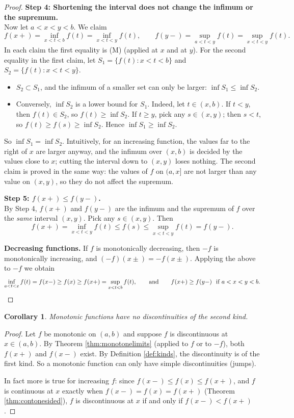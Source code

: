 \documentclass{article}
\theoremstyle{mythm}
\newtheorem{corollary}{Corollary}[theorem]
\begin{document}
\begin{proof}
\textbf{Step 4: Shortening the interval does not change the infimum or the supremum.}\\
Now let $a < x < y < b$. We claim
\[
f(x+) = \inf_{x < t < b} f(t) = \inf_{x < t < y} f(t), \qquad f(y-) = \sup_{a < t < y} f(t) = \sup_{x < t < y} f(t).
\]
In each claim the first equality is (M) (applied at $x$ and at $y$). For the second equality in the first claim, let $S_1 = \{f(t) : x < t < b\}$ and $S_2 = \{f(t) : x < t < y\}$.
\begin{itemize}
    \item $S_2 \subset S_1$, and the infimum of a smaller set can only be larger: $\inf S_1 \leq \inf S_2$.
    \item Conversely, $\inf S_2$ is a lower bound for $S_1$. Indeed, let $t \in (x,b)$. If $t < y$, then $f(t) \in S_2$, so $f(t) \geq \inf S_2$. If $t \geq y$, pick any $s \in (x,y)$; then $s < t$, so $f(t) \geq f(s) \geq \inf S_2$. Hence $\inf S_1 \geq \inf S_2$.
\end{itemize}
So $\inf S_1 = \inf S_2$. Intuitively, for an increasing function, the values far to the right of $x$ are larger anyway, and the infimum over $(x,b)$ is decided by the values close to $x$; cutting the interval down to $(x,y)$ loses nothing. The second claim is proved in the same way: the values of $f$ on $(a, x]$ are not larger than any value on $(x,y)$, so they do not affect the supremum.

\textbf{Step 5: $f(x+) \leq f(y-)$.}\\
By Step 4, $f(x+)$ and $f(y-)$ are the infimum and the supremum of $f$ over the \textit{same} interval $(x,y)$. Pick any $s \in (x,y)$. Then
\[
f(x+) = \inf_{x<t<y} f(t) \leq f(s) \leq \sup_{x<t<y} f(t) = f(y-).
\]

\textbf{Decreasing functions.} If $f$ is monotonically decreasing, then $-f$ is monotonically increasing, and $(-f)(x\pm) = -f(x\pm)$. Applying the above to $-f$ we obtain
\[
\inf_{a<t<x} f(t) = f(x-) \geq f(x) \geq f(x+) = \sup_{x<t<b} f(t), \qquad\text{and}\qquad f(x+) \geq f(y-) \ \text{ if } a < x < y < b. \qedhere
\]
\end{proof}

\begin{corollary}\label{cor:nosecondkind}
Monotonic functions have no discontinuities of the second kind.
\end{corollary}

\begin{proof}
Let $f$ be monotonic on $(a,b)$ and suppose $f$ is discontinuous at $x \in (a,b)$. By Theorem \ref{thm:monotonelimits} (applied to $f$ or to $-f$), both $f(x+)$ and $f(x-)$ exist. By Definition \ref{def:kinds}, the discontinuity is of the first kind. So a monotonic function can only have simple discontinuities (jumps).

In fact more is true for increasing $f$: since $f(x-) \leq f(x) \leq f(x+)$, and $f$ is continuous at $x$ exactly when $f(x-) = f(x) = f(x+)$ (Theorem \ref{thm:contonesided}), $f$ is discontinuous at $x$ if and only if $f(x-) < f(x+)$.
\end{proof}
\end{document}
